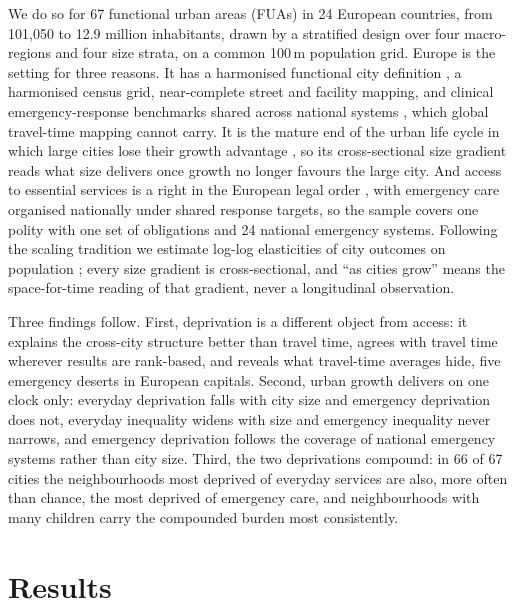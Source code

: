 \documentclass[9pt,twocolumn]{article}
\begin{document}
We do so for 67 functional urban areas (FUAs) in 24 European countries,
from 101{,}050 to 12.9 million inhabitants, drawn by a stratified design
over four macro-regions and four size strata, on a common 100\,m
population grid. Europe is the setting for three reasons. It has a
harmonised functional city definition \citep{dijkstra2019fua}, a
harmonised census grid, near-complete street and facility mapping, and
clinical emergency-response benchmarks shared across national systems
\citep{pons2005response,blanchard2012response,peleg2004ems}, which global
travel-time mapping \citep{weiss2020healthcare,wu2025global} cannot carry.
It is the mature end of the urban life cycle in which large cities lose
their growth advantage \citep{musso2026cities}, so its cross-sectional
size gradient reads what size delivers once growth no longer favours the
large city. And access to essential services is a right in the European
legal order \citep{eu2012charter,eu2017pillar}, with emergency care
organised nationally under shared response targets, so the sample covers
one polity with one set of obligations and 24 national emergency systems.
Following the scaling tradition we estimate log-log elasticities of city
outcomes on population \citep{bettencourt2007growth}; every size gradient
is cross-sectional, and ``as cities grow'' means the space-for-time reading
of that gradient, never a longitudinal observation.

Three findings follow. First, deprivation is a different object from
access: it explains the cross-city structure better than travel time,
agrees with travel time wherever results are rank-based, and reveals what
travel-time averages hide, five emergency deserts in European capitals.
Second, urban growth delivers on one clock only: everyday deprivation falls
with city size and emergency deprivation does not, everyday inequality
widens with size and emergency inequality never narrows, and emergency
deprivation follows the coverage of national emergency systems rather than
city size. Third, the two deprivations compound: in 66 of 67 cities the
neighbourhoods most deprived of everyday services are also, more often
than chance, the most deprived of emergency care, and neighbourhoods with
many children carry the compounded burden most consistently.

\section*{Results}
\end{document}
